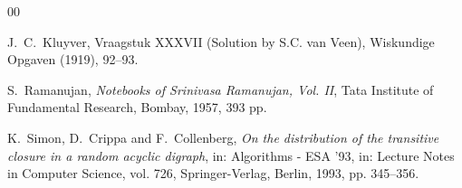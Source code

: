 \documentclass[11pt,reqno]{amsart}
\renewcommand{\(}{\left\(}
\renewcommand{\)}{\right\)}
\renewcommand{\[}{\left\[}
\renewcommand{\]}{\right\]}
\numberwithin{equation}{section}
\theoremstyle{plain}
\begin{document}
\begin{thebibliography}{00}
 
 
 
 
 
 
  J.~C.~Kluyver, Vraagstuk XXXVII (Solution by S.C. van Veen), Wiskundige Opgaven (1919), 92--93.
 
 
 
 
 S.~Ramanujan, \emph{Notebooks of Srinivasa Ramanujan, Vol. II}, Tata Institute of Fundamental Research, Bombay, 1957, 393 pp.


 
  

K.~Simon, D.~Crippa and F.~Collenberg,  \emph{On the distribution of the transitive closure in a random acyclic digraph},  in: Algorithms - ESA ’93,  in: Lecture Notes in Computer Science, vol. 726, Springer-Verlag, Berlin, 1993, pp. 345--356.


\end{thebibliography}
\end{document}
